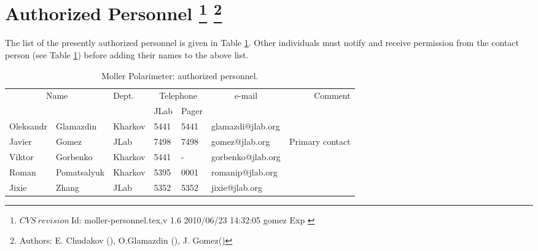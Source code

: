 \section[Authorized  Personnel]{Authorized  Personnel
\label{sec:moller-pers}
\footnote{
   $CVS~revision~ $Id: moller-personnel.tex,v 1.6 2010/06/23 14:32:05 gomez Exp $ $
 }
\footnote{Authors: E. Chudakov (), O.Glamazdin (), J. Gomez\hfill\break ()}
}
The list
of the presently authorized personnel is given in Table \ref{tab:moller:personnel}.
Other individuals must notify and receive permission from
the contact person (see Table \ref{tab:moller:personnel}) before adding their names 
to the above list.
\begin{table}[ht]
\begin{center}
\begin{tabular}{|ll|l|l|l|l|r|} \hline
  \multicolumn{2}{|c|}{Name} & Dept. & \multicolumn{2}{c|}{Telephone} & 
  \multicolumn{1}{c|}{e-mail} & Comment \\ 
  \cline{4-5}
   &  &   & JLab & Pager &  & \\ 
\hline
 Oleksandr    & Glamazdin       & Kharkov & 5441 & 5441 & glamazdi@jlab.org &  \\ 
  Javier & Gomez  & JLab    & 7498 & 7498 & gomez@jlab.org      & Primary contact     \\ 
Viktor       & Gorbenko        & Kharkov & 5441 &   -  & gorbenko@jlab.org &  \\ 
 Roman        & Pomatsalyuk     & Kharkov & 5395 & 0001 & romanip@jlab.org  &  \\ 
Jixie & Zhang & JLab & 5352 & 5352 & jixie@jlab.org \\
\hline
\end{tabular}
\end{center}
\caption[Moller Polarimeter: authorized personnel]{
   Moller Polarimeter: authorized personnel.
}
\label{tab:moller:personnel}
\end{table}


